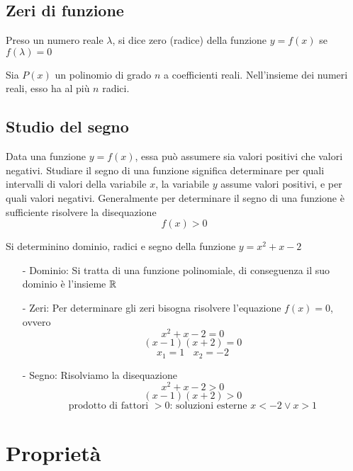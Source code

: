 \documentclass{article}     %
\begin{document}
    \subsection{Zeri di funzione}
        \begin{definition}
            Preso un numero reale $\lambda$, si dice zero (radice) della funzione $y=f(x)$ se $f(\lambda)=0$
        \end{definition}
        \begin{theorem}
            Sia $P(x)$ un polinomio di grado $n$ a coefficienti reali. Nell'insieme dei numeri reali, esso ha al più $n$ radici.
        \end{theorem}
    \subsection{Studio del segno}
        Data una funzione $y=f(x)$, essa può assumere sia valori positivi che valori negativi. Studiare il segno di una funzione significa determinare per quali intervalli di valori della variabile $x$, la variabile $y$ assume valori positivi, e per quali valori negativi. Generalmente per determinare il segno di una funzione è sufficiente risolvere la disequazione \[f(x)>0\]
        \begin{ex}
            Si determinino dominio, radici e segno della funzione $y=x^2+x-2$
        \end{ex}
            \begin{enumerate}
                \item[-] Dominio: Si tratta di una funzione polinomiale, di conseguenza il suo dominio è l'insieme $\mathbb{R}$
                \item[-] Zeri: Per determinare gli zeri bisogna risolvere l'equazione $f(x)=0$, ovvero \[x^2+x-2=0\]\[(x-1)(x+2)=0\]\[x_1=1~~~~x_2=-2\]
                \item[-] Segno: Risolviamo la disequazione \[x^2+x-2>0\]\[(x-1)(x+2)>0\]\[\text{prodotto di fattori } >0 \text{: soluzioni esterne }x<-2\lor x>1\]
            \end{enumerate}
    \section{Proprietà}
\end{document}
